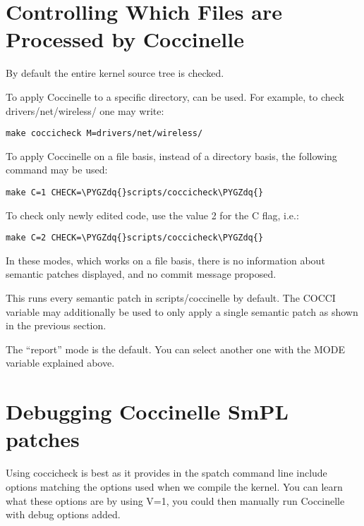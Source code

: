 \documentclass[a4paper,8pt,english]{sphinxmanual}
\def\PYGZdq{\char`\"}
\begin{document}
\section{Controlling Which Files are Processed by Coccinelle}
\label{dev-tools/coccinelle:controlling-which-files-are-processed-by-coccinelle}
By default the entire kernel source tree is checked.

To apply Coccinelle to a specific directory,  can be used.
For example, to check drivers/net/wireless/ one may write:

\begin{Verbatim}[commandchars=\\\{\}]
make coccicheck M=drivers/net/wireless/
\end{Verbatim}

To apply Coccinelle on a file basis, instead of a directory basis, the
following command may be used:

\begin{Verbatim}[commandchars=\\\{\}]
make C=1 CHECK=\PYGZdq{}scripts/coccicheck\PYGZdq{}
\end{Verbatim}

To check only newly edited code, use the value 2 for the C flag, i.e.:

\begin{Verbatim}[commandchars=\\\{\}]
make C=2 CHECK=\PYGZdq{}scripts/coccicheck\PYGZdq{}
\end{Verbatim}

In these modes, which works on a file basis, there is no information
about semantic patches displayed, and no commit message proposed.

This runs every semantic patch in scripts/coccinelle by default. The
COCCI variable may additionally be used to only apply a single
semantic patch as shown in the previous section.

The ``report'' mode is the default. You can select another one with the
MODE variable explained above.


\section{Debugging Coccinelle SmPL patches}
\label{dev-tools/coccinelle:debugging-coccinelle-smpl-patches}
Using coccicheck is best as it provides in the spatch command line
include options matching the options used when we compile the kernel.
You can learn what these options are by using V=1, you could then
manually run Coccinelle with debug options added.
\end{document}
